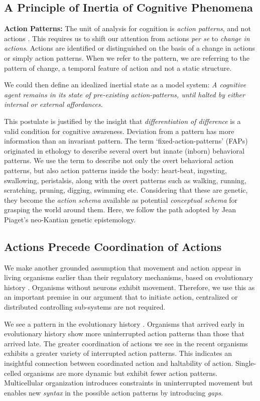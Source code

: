 \subsection{A Principle of Inertia of Cognitive Phenomena}
\textbf{Action Patterns: }The unit of analysis for cognition is \textit{action patterns}, and not actions \cite{bateson2000steps}.  This requires us to shift our attention from actions \textit{per se} to \textit{change in actions}. Actions are identified or distinguished on the basis of a change in actions or simply action patterns. When we refer to the pattern, we are referring to the pattern of change, a temporal feature of action and not a static structure. 

We could then define an idealized inertial state as a model system:  \textit{A cognitive agent remains in its state of pre-existing action-patterns, until halted by either internal or external affordances.} 

This postulate is justified by the insight that \textit{differentiation of difference} is a valid condition for cognitive awareness.\cite{bateson2000steps} Deviation from a pattern has more information than an invariant pattern. The term `fixed-action-patterns' (FAPs) originated in ethology to describe several overt but innate (inborn) behavioral patterns. We use the term to describe not only the overt behavioral action patterns, but also action patterns inside the body: heart-beat, ingesting, swallowing, peristalsis, along with the overt patterns such as walking, running, scratching, pruning, digging, swimming etc.  Considering that these are genetic, they become the \textit{action schema} available as potential \textit{conceptual schema} for grasping the world around them.  Here, we follow the path adopted by Jean Piaget's neo-Kantian genetic epistemology.\cite{piaget-biology-knowledge}

\subsection{Actions Precede Coordination of Actions}

We make another grounded assumption that movement and action appear in living organisms earlier than their regulatory mechanisms, based on evolutionary history \cite{Levin2014}.  Organisms without neurons exhibit movement. Therefore, we use this as an important premise in our argument that to initiate action, centralized or distributed controlling sub-systems are not required.  

We see a pattern in the evolutionary history \cite{Levin2014}.  Organisms that arrived early in evolutionary history show more uninterrupted action patterns than those that arrived late. The greater coordination of actions we see in the recent organisms exhibits a greater variety of interrupted action patterns. This indicates an insightful connection between coordinated action and haltability of action. Single-celled organisms are more dynamic but exhibit fewer action patterns. Multicellular organization introduces constraints in uninterrupted movement but enables new \textit{syntax} in the possible action patterns by introducing \textit{gaps}.  

